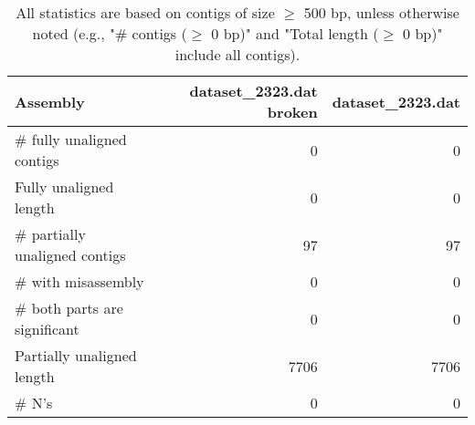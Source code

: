 \documentclass[12pt,a4paper]{article}
\begin{document}
\begin{table}[ht]
\begin{center}
\caption{All statistics are based on contigs of size $\geq$ 500 bp, unless otherwise noted (e.g., "\# contigs ($\geq$ 0 bp)" and "Total length ($\geq$ 0 bp)" include all contigs).}
\begin{tabular}{|l*{2}{|r}|}
\hline
Assembly & dataset\_2323.dat broken & dataset\_2323.dat \\ \hline
\# fully unaligned contigs & 0 & 0 \\ \hline
Fully unaligned length & 0 & 0 \\ \hline
\# partially unaligned contigs & 97 & 97 \\ \hline
\hspace{5mm}\# with misassembly & 0 & 0 \\ \hline
\hspace{5mm}\# both parts are significant & 0 & 0 \\ \hline
Partially unaligned length & 7706 & 7706 \\ \hline
\# N's & 0 & 0 \\ \hline
\end{tabular}
\end{center}
\end{table}
\end{document}
